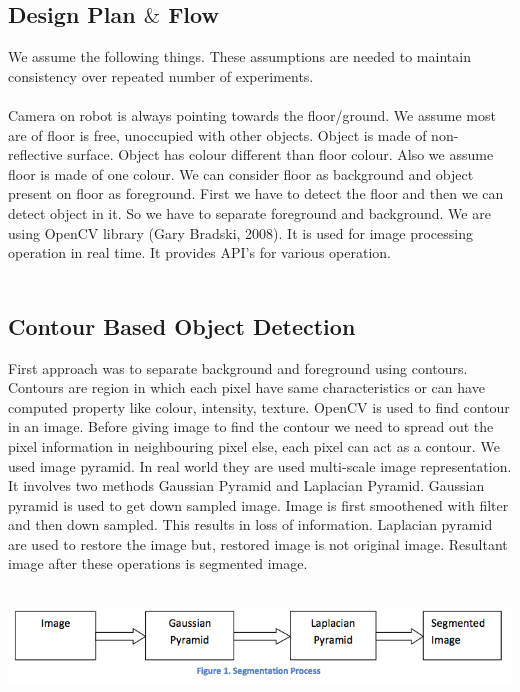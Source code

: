\documentclass[12pt]{article}
\begin{document}
\subsection{Design Plan $\&$ Flow}
We assume the following things. These assumptions are needed to maintain consistency over repeated number of experiments.\\
\\
Camera on robot is always pointing towards the floor/ground. We assume most are of floor is free, unoccupied with other objects. Object is made of non-reflective surface. Object has colour different than floor colour. Also we assume floor is made of one colour. We can consider floor as background and object present on floor as foreground. First we have to detect the floor and then we can detect object in it. So we have to separate foreground and background. We are using OpenCV library (Gary Bradski, 2008). It is used for image processing operation in real time. It provides API's for various operation.\\
\\
\subsection{Contour Based Object Detection}
First approach was to separate background and foreground using contours. Contours are region in which each pixel have same characteristics or can have computed property like colour, intensity, texture. OpenCV is used to find contour in an image. Before giving image to find the contour we need to spread out the pixel information in neighbouring pixel else, each pixel can act as a contour. We used image pyramid. In real world they are used multi-scale image representation. It involves two methods Gaussian Pyramid and Laplacian Pyramid. Gaussian pyramid is used to get down sampled image. Image is first smoothened with filter and then down sampled. This results in loss of information. Laplacian pyramid are used to restore the image but, restored image is not original image. Resultant image after these operations is segmented image.
\\
\\
\begin{center} \includegraphics[scale=0.4]{a1} \end{center}
\end{document}
